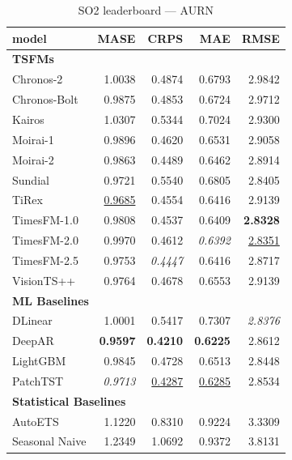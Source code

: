 \begin{table}[H]
\caption{SO2 leaderboard --- AURN}
\centering
\begin{small}
\begin{tabular}{lrrrr}
\toprule
model & MASE & CRPS & MAE & RMSE \\
\midrule
\multicolumn{5}{l}{\textbf{TSFMs}} \\
Chronos-2 & 1.0038 & 0.4874 & 0.6793 & 2.9842 \\
Chronos-Bolt & 0.9875 & 0.4853 & 0.6724 & 2.9712 \\
Kairos & 1.0307 & 0.5344 & 0.7024 & 2.9300 \\
Moirai-1 & 0.9896 & 0.4620 & 0.6531 & 2.9058 \\
Moirai-2 & 0.9863 & 0.4489 & 0.6462 & 2.8914 \\
Sundial & 0.9721 & 0.5540 & 0.6805 & 2.8405 \\
TiRex & \underline{0.9685} & 0.4554 & 0.6416 & 2.9139 \\
TimesFM-1.0 & 0.9808 & 0.4537 & 0.6409 & \textbf{2.8328} \\
TimesFM-2.0 & 0.9970 & 0.4612 & \textit{0.6392} & \underline{2.8351} \\
TimesFM-2.5 & 0.9753 & \textit{0.4447} & 0.6416 & 2.8717 \\
VisionTS++ & 0.9764 & 0.4678 & 0.6553 & 2.9139 \\
\midrule
\multicolumn{5}{l}{\textbf{ML Baselines}} \\
DLinear & 1.0001 & 0.5417 & 0.7307 & \textit{2.8376} \\
DeepAR & \textbf{0.9597} & \textbf{0.4210} & \textbf{0.6225} & 2.8612 \\
LightGBM & 0.9845 & 0.4728 & 0.6513 & 2.8448 \\
PatchTST & \textit{0.9713} & \underline{0.4287} & \underline{0.6285} & 2.8534 \\
\midrule
\multicolumn{5}{l}{\textbf{Statistical Baselines}} \\
AutoETS & 1.1220 & 0.8310 & 0.9224 & 3.3309 \\
Seasonal Naive & 1.2349 & 1.0692 & 0.9372 & 3.8131 \\
\bottomrule
\end{tabular}
\end{small}
\end{table}